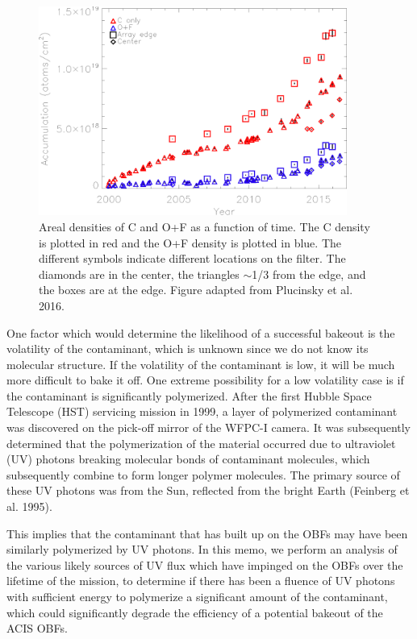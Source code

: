 \documentclass[11pt]{article}
\begin{document}
\begin{figure}
\begin{center}
\includegraphics[width=0.9\textwidth]{areal_density.eps}
\caption{Areal densities of C and O+F as a function of time. The C density is plotted
in red and the O+F density is plotted in blue. The different symbols indicate different
locations on the filter. The diamonds are in the center, the triangles $\sim$1/3 from
the edge, and the boxes are at the edge. Figure adapted from Plucinsky et al. 2016.\label{fig:areal_density}}
\end{center}
\end{figure}

One factor which would determine the likelihood of a successful bakeout is the volatility
of the contaminant, which is unknown since we do not know its molecular structure. If the
volatility of the contaminant is low, it will be much more difficult to bake it off. One
extreme possibility for a low volatility case is if the contaminant is significantly polymerized.
After the first Hubble Space Telescope (HST) servicing mission in 1999, a layer of polymerized
contaminant was discovered on the pick-off mirror of the WFPC-I camera. It was subsequently
determined that the polymerization of the material occurred due to ultraviolet (UV) photons
breaking molecular bonds of contaminant molecules, which subsequently combine to form longer
polymer molecules. The primary source of these UV photons was from the Sun, reflected from
the bright Earth (Feinberg et al. 1995).

This implies that the contaminant that has built up on the OBFs may have been similarly
polymerized by UV photons. In this memo, we perform an analysis of the various likely
sources of UV flux which have impinged on the OBFs over the lifetime of the mission,
to determine if there has been a fluence of UV photons with sufficient energy to polymerize
a significant amount of the contaminant, which could significantly degrade the efficiency
of a potential bakeout of the ACIS OBFs.
\end{document}
